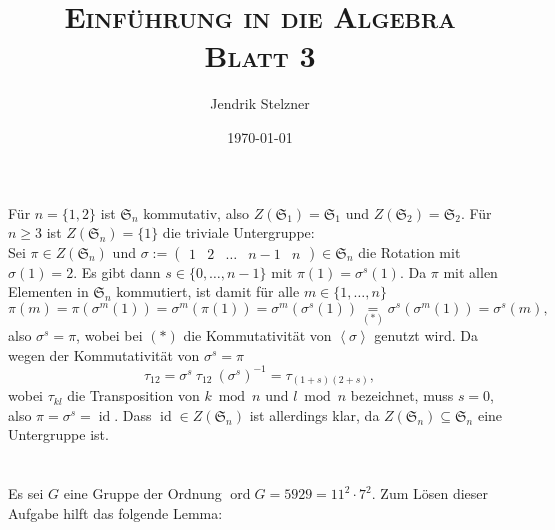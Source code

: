 \documentclass[a4paper,10pt]{article}
\title{\textsc{Einführung in die Algebra \\ \Large Blatt 3}}
\author{Jendrik Stelzner}
\date{\today}
\theoremstyle{definition}
\newcommand{\Sn}{\mathfrak{S}}
\newcommand{\id}{\operatorname{id}}
\newcommand{\ord}{\operatorname{ord}}
\newcommand{\vect}[1]{\begin{pmatrix}#1\end{pmatrix}}
\newcommand{\gen}[1]{\left\langle#1\right\rangle}
\begin{document}
\maketitle





\section{}
Für $n = \{1,2\}$ ist $\Sn_n$ kommutativ, also $Z(\Sn_1) = \Sn_1$ und $Z(\Sn_2) = \Sn_2$. Für $n \geq 3$ ist $Z(\Sn_n) = \{1\}$ die triviale Untergruppe:\\
Sei $\pi \in Z(\Sn_n)$ und $\sigma := \vect{1&2&\ldots&n-1&n} \in \Sn_n$ die Rotation mit $\sigma(1)=2$. Es gibt dann $s \in \{0,\ldots,n-1\}$ mit $\pi(1) = \sigma^s(1)$. Da $\pi$ mit allen Elementen in $\Sn_n$ kommutiert, ist damit für alle $m \in \{1,\ldots,n\}$
\[
 \pi(m)
 = \pi(\sigma^m(1))
 = \sigma^m(\pi(1))
 = \sigma^m(\sigma^s(1))
 \underset{(*)}{=} \sigma^s(\sigma^m(1))
 = \sigma^s(m),
\]
also $\sigma^s = \pi$, wobei bei $(*)$ die Kommutativität von $\gen{\sigma}$ genutzt wird. Da wegen der Kommutativität von $\sigma^s = \pi$
\[
 \tau_{12} = \sigma^s\ \tau_{12}\ (\sigma^s)^{-1} = \tau_{(1+s)(2+s)},
\]
wobei $\tau_{kl}$ die Transposition von $k \bmod n$ und $l \bmod n$ bezeichnet, muss $s = 0$, also $\pi = \sigma^s = \id$. Dass $\id \in Z(\Sn_n)$ ist allerdings klar, da $Z(\Sn_n) \subseteq \Sn_n$ eine Untergruppe ist.





\section{}
Es sei $G$ eine Gruppe der Ordnung $\ord G = 5929 = 11^2 \cdot 7^2$. Zum Lösen dieser Aufgabe hilft das folgende Lemma:
\end{document}
